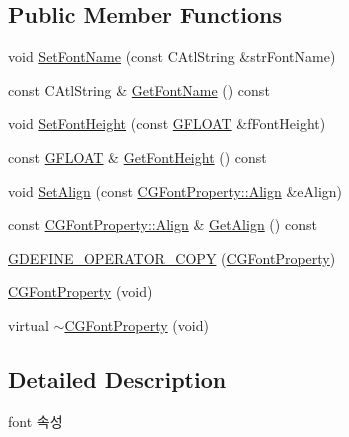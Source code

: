 \subsection*{Public Member Functions}
\begin{DoxyCompactItemize}
\item 
void \hyperlink{class_c_g_font_property_a68ab9a7625a8a5d1859a48ae366d2cbc}{Set\+Font\+Name} (const C\+Atl\+String \&str\+Font\+Name)
\item 
const C\+Atl\+String \& \hyperlink{class_c_g_font_property_acef2504d5a603bca89e9f6274652db4a}{Get\+Font\+Name} () const 
\item 
void \hyperlink{class_c_g_font_property_a0482c286665fb9fca1e9b86a83c71dba}{Set\+Font\+Height} (const \hyperlink{_g_types_8h_abf6eba8223df62f199b811a6c52ff2ef}{G\+F\+L\+O\+A\+T} \&f\+Font\+Height)
\item 
const \hyperlink{_g_types_8h_abf6eba8223df62f199b811a6c52ff2ef}{G\+F\+L\+O\+A\+T} \& \hyperlink{class_c_g_font_property_a35a17a0bca8ef7258c10ba57a6b45cb3}{Get\+Font\+Height} () const 
\item 
void \hyperlink{class_c_g_font_property_ad4cb3290696e8cf366f5e8baa2753b6e}{Set\+Align} (const \hyperlink{class_c_g_font_property_a78916b6f9d723f2ba7082f2b4f7fd1b7}{C\+G\+Font\+Property\+::\+Align} \&e\+Align)
\item 
const \hyperlink{class_c_g_font_property_a78916b6f9d723f2ba7082f2b4f7fd1b7}{C\+G\+Font\+Property\+::\+Align} \& \hyperlink{class_c_g_font_property_a67a8808329a593aa33e4913cefd6ac29}{Get\+Align} () const 
\item 
\hyperlink{class_c_g_font_property_ac87ed978221d59adc7a5423402d8677d}{G\+D\+E\+F\+I\+N\+E\+\_\+\+O\+P\+E\+R\+A\+T\+O\+R\+\_\+\+C\+O\+P\+Y} (\hyperlink{class_c_g_font_property}{C\+G\+Font\+Property})
\item 
\hyperlink{class_c_g_font_property_a95e1c67592101472a2e51cc093d2b188}{C\+G\+Font\+Property} (void)
\item 
virtual \hyperlink{class_c_g_font_property_a83898aaa8c45ca6266b6ebee3bbbca07}{$\sim$\+C\+G\+Font\+Property} (void)
\end{DoxyCompactItemize}


\subsection{Detailed Description}

\begin{DoxyItemize}
\item font 속성 
\end{DoxyItemize}

